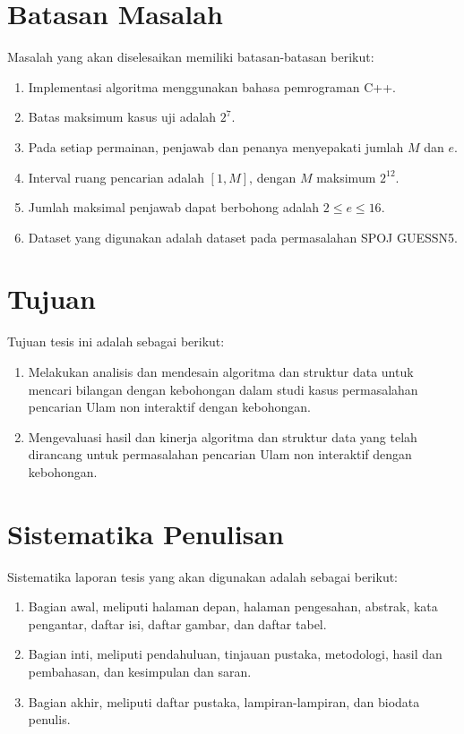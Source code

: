 \section {Batasan Masalah}
Masalah yang akan diselesaikan memiliki batasan-batasan berikut:

\begin{enumerate}
  \item Implementasi algoritma menggunakan bahasa pemrograman C++.
  \item Batas maksimum kasus uji adalah $2^7$.
  \item Pada setiap permainan, penjawab dan penanya menyepakati jumlah $M$ dan $e$.
  \item Interval ruang pencarian adalah $[1,M]$, dengan $M$ maksimum $2^{12}$.
  \item Jumlah maksimal penjawab dapat berbohong adalah $2 \leq e \leq 16$.
  \item Dataset yang digunakan adalah dataset pada permasalahan SPOJ GUESSN5.
\end{enumerate}


\section {Tujuan}
Tujuan tesis ini adalah sebagai berikut:

\begin{enumerate}
  \item Melakukan analisis dan mendesain algoritma dan struktur data untuk mencari bilangan dengan kebohongan dalam studi kasus permasalahan pencarian Ulam non interaktif dengan kebohongan.
  \item Mengevaluasi hasil dan kinerja algoritma dan struktur data yang telah dirancang untuk permasalahan pencarian Ulam non interaktif dengan kebohongan.
\end{enumerate}


\section {Sistematika Penulisan}
Sistematika laporan tesis yang akan digunakan adalah sebagai berikut:

\begin{enumerate}
\item Bagian awal, meliputi halaman depan, halaman pengesahan, abstrak, kata pengantar, daftar isi, daftar gambar, dan daftar tabel.
\item Bagian inti, meliputi pendahuluan, tinjauan pustaka, metodologi, hasil dan pembahasan, dan kesimpulan dan saran.
\item Bagian akhir, meliputi daftar pustaka, lampiran-lampiran, dan biodata penulis.
\end{enumerate}
